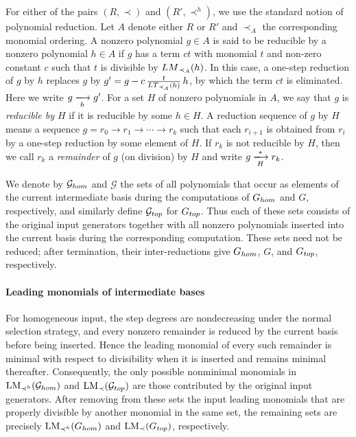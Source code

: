 \documentclass{article}
\theoremstyle{definition}
\theoremstyle{plain}
\theoremstyle{plain}
\theoremstyle{plain}
\theoremstyle{plain}
\numberwithin{equation}{subsection}
\begin{document}
For either of the pairs $(R,\prec)$ and $(R',\prec^h)$, we use the standard notion of polynomial reduction.
Let $A$ denote either $R$ or $R'$ and $\prec_A$ the corresponding monomial ordering.
A nonzero polynomial $g\in A$ is said to be reducible by a nonzero polynomial $h\in A$ if $g$ has a term $ct$ with monomial $t$ and non-zero constant $c$ such that $t$ is divisible by ${\rm LM}_{\prec_A}(h)$. 
In this case, a one-step reduction of $g$ by $h$ replaces $g$ by $g'=g-c\,\frac{t}{{\rm LT}_{{\prec_A}}(h)}\,h$, by which the term $ct$ is eliminated.
Here we write $g\xlongrightarrow[h]{}g'$.
For a set $H$ of nonzero polynomials in $A$, we say that $g$ is {\em reducible by $H$} if it is reducible by some $h\in H$.
A reduction sequence of $g$ by $H$ means a sequence $g=r_0 \to r_1 \to \cdots \to r_k$ such that each $r_{i+1}$ is obtained from $r_i$ by a one-step reduction by some element of $H$.
If $r_k$ is not reducible by $H$, then we call $r_k$ a {\em remainder} of $g$ (on division) by $H$ and write $g\xlongrightarrow[H]{*}{r_k}$.

We denote by $\mathcal G_{\rm hom}$ and $\mathcal G$ the sets of all polynomials that occur as elements of the current intermediate basis during the computations of $G_{\rm hom}$ and $G$, respectively, and similarly define $\mathcal G_{\rm top}$ for $G_{\rm top}$.
Thus each of these sets consists of the original input generators together with all nonzero polynomials inserted into the current basis during the corresponding computation.
These sets need not be reduced; after termination, their inter-reductions give $G_{\rm hom}$, $G$, and $G_{\rm top}$, respectively.

\paragraph{Leading monomials of intermediate bases}
For homogeneous input, the step degrees are nondecreasing under the normal selection strategy, and every nonzero remainder is reduced by the current basis before being inserted.
Hence the leading monomial of every such remainder is minimal with respect to divisibility when it is inserted and remains minimal thereafter.
Consequently, the only possible nonminimal monomials in $\operatorname{LM}_{\prec^h}(\mathcal G_{\rm hom})$ and $\operatorname{LM}_{\prec}(\mathcal G_{\rm top})$ are those contributed by the original input generators.
After removing from these sets the input leading monomials that are properly divisible by another monomial in the same set, the remaining sets are precisely $\operatorname{LM}_{\prec^h}(G_{\rm hom})$ and $\operatorname{LM}_{\prec}(G_{\rm top})$, respectively.
\end{document}
